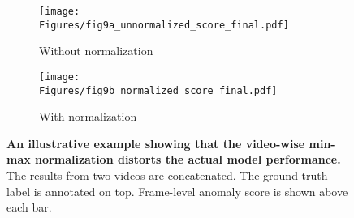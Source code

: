 \begin{figure}[t]
  \centering
  \begin{subfigure}[b]{0.49\linewidth}
    \captionsetup{justification=centering}
    \texttt{[image: Figures/fig9a\_unnormalized\_score\_final.pdf]}
    \caption{Without normalization}
  \end{subfigure}
  \begin{subfigure}[b]{0.49\linewidth}
    \captionsetup{justification=centering}
    \texttt{[image: Figures/fig9b\_normalized\_score\_final.pdf]}
    \caption{With normalization}
  \end{subfigure}
  \caption{\textbf{An illustrative example showing that the video-wise min-max normalization distorts the actual model performance.} The results from two videos are concatenated. The ground truth label is annotated on top. Frame-level anomaly score is shown above each bar.}
  \label{fig:metrics-eg}
\end{figure}

\begin{table}[t]
  \begin{center}
    \caption{Comparison of anomaly detection performance with different methods on DoTA. The variants of Xen without $^\star$ start Kalman filtering only when all the experts start to produce anomaly scores, while those with $^\star$ start filtering since the video start time.}
    \label{table:overall-results}
  \end{center}
\end{table}

